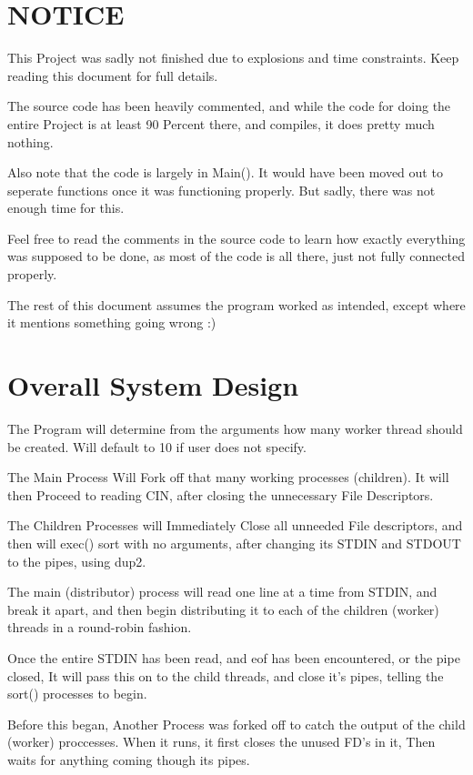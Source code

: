 \documentclass[letterpaper,10pt,titlepage]{article}
\begin{document}
\tableofcontents

\section{NOTICE}

This Project was sadly not finished due to explosions and time constraints.  Keep reading this document for full details.

The source code has been heavily commented, and while the code for doing the entire Project is at least 90 Percent there, and compiles, it does pretty much nothing.

Also note that the code is largely in Main().  It would have been moved out to seperate functions once it was functioning properly.  But sadly, there was not enough time for this.

Feel free to read the comments in the source code to learn how exactly everything was supposed to be done, as most of the code is all there, just not fully connected properly.

The rest of this document assumes the program worked as intended, except where it mentions something going wrong :)

\section{Overall System Design}

The Program will determine from the arguments how many worker thread should be created.  Will default to 10 if user does not specify.

The Main Process Will Fork off that many working processes (children).  It will then Proceed to reading CIN, after closing the unnecessary File Descriptors.

The Children Processes will Immediately Close all unneeded File descriptors, and then will exec() sort with no arguments, after changing its STDIN and STDOUT to the pipes, using dup2.

The main (distributor) process will read one line at a time from STDIN, and break it apart, and then begin distributing it to each of the children (worker) threads in a round-robin fashion.

Once the entire STDIN has been read, and eof has been encountered, or the pipe closed, It will pass this on to the child threads, and close it's pipes, telling the sort() processes to begin.

Before this began, Another Process was forked off to catch the output of the child (worker) proccesses.  When it runs, it first closes the unused FD's in it, Then waits for anything coming though its pipes.
\end{document}

